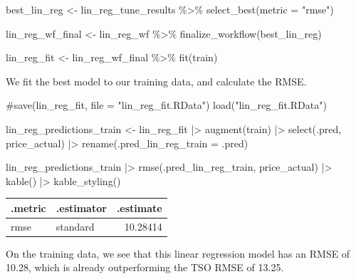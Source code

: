 \documentclass[
]{article}
\newenvironment{Shaded}{\begin{snugshade}}{\end{snugshade}}
\newcommand{\AttributeTok}[1]{\textcolor[rgb]{0.40,0.45,0.13}{#1}}
\newcommand{\CommentTok}[1]{\textcolor[rgb]{0.37,0.37,0.37}{#1}}
\newcommand{\FunctionTok}[1]{\textcolor[rgb]{0.28,0.35,0.67}{#1}}
\newcommand{\NormalTok}[1]{\textcolor[rgb]{0.00,0.23,0.31}{#1}}
\newcommand{\OtherTok}[1]{\textcolor[rgb]{0.00,0.23,0.31}{#1}}
\newcommand{\SpecialCharTok}[1]{\textcolor[rgb]{0.37,0.37,0.37}{#1}}
\newcommand{\StringTok}[1]{\textcolor[rgb]{0.13,0.47,0.30}{#1}}
\begin{document}
\begin{Shaded}
\begin{Highlighting}[]
\NormalTok{best\_lin\_reg }\OtherTok{\textless{}{-}}\NormalTok{ lin\_reg\_tune\_results }\SpecialCharTok{\%\textgreater{}\%}
  \FunctionTok{select\_best}\NormalTok{(}\AttributeTok{metric =} \StringTok{"rmse"}\NormalTok{)}

\NormalTok{lin\_reg\_wf\_final }\OtherTok{\textless{}{-}}\NormalTok{ lin\_reg\_wf }\SpecialCharTok{\%\textgreater{}\%}
  \FunctionTok{finalize\_workflow}\NormalTok{(best\_lin\_reg)}

\NormalTok{lin\_reg\_fit }\OtherTok{\textless{}{-}}\NormalTok{ lin\_reg\_wf\_final }\SpecialCharTok{\%\textgreater{}\%}
  \FunctionTok{fit}\NormalTok{(train)}
\end{Highlighting}
\end{Shaded}

We fit the best model to our training data, and calculate the RMSE.

\begin{Shaded}
\begin{Highlighting}[]
\CommentTok{\#save(lin\_reg\_fit, file = "lin\_reg\_fit.RData")}
\FunctionTok{load}\NormalTok{(}\StringTok{"lin\_reg\_fit.RData"}\NormalTok{)}

\NormalTok{lin\_reg\_predictions\_train }\OtherTok{\textless{}{-}}\NormalTok{ lin\_reg\_fit }\SpecialCharTok{|\textgreater{}}
  \FunctionTok{augment}\NormalTok{(train) }\SpecialCharTok{|\textgreater{}}
  \FunctionTok{select}\NormalTok{(.pred, price\_actual) }\SpecialCharTok{|\textgreater{}}
  \FunctionTok{rename}\NormalTok{(}\AttributeTok{.pred\_lin\_reg\_train =}\NormalTok{ .pred)}

\NormalTok{lin\_reg\_predictions\_train }\SpecialCharTok{|\textgreater{}}
  \FunctionTok{rmse}\NormalTok{(.pred\_lin\_reg\_train, price\_actual) }\SpecialCharTok{|\textgreater{}}
  \FunctionTok{kable}\NormalTok{() }\SpecialCharTok{|\textgreater{}}
  \FunctionTok{kable\_styling}\NormalTok{()}
\end{Highlighting}
\end{Shaded}

\begin{longtable*}[t]{llr}
\toprule
.metric & .estimator & .estimate\\
\midrule
rmse & standard & 10.28414\\
\bottomrule
\end{longtable*}

On the training data, we see that this linear regression model has an
RMSE of 10.28, which is already outperforming the TSO RMSE of 13.25.
\end{document}
